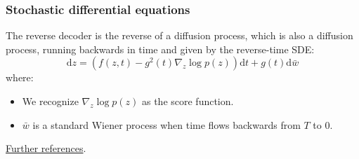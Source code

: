\documentclass{beamer}
\begin{document}
\begin{frame}
    \frametitle{Stochastic differential equations}
    The reverse decoder is the reverse of a diffusion process, which is also a diffusion process, running backwards in time and given by the reverse-time SDE:
    \begin{equation*}
        \mathrm{d}z=(f(z,t)-g^{2}(t)\nabla_{z}\log{}p(z))\mathrm{d}t+g(t)\mathrm{d}\bar{w}
    \end{equation*}
    where:
    \begin{itemize}
        \item We recognize $\nabla_{z}\log{}p(z)$ as the score function.
        \item $\bar{w}$ is a standard Wiener process when time flows backwards from $T$ to $0$.
    \end{itemize}
    \href{https://arxiv.org/pdf/2011.13456}{Further references}.
\end{frame}
\end{document}
